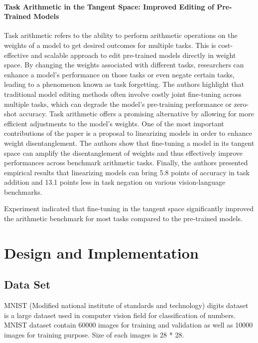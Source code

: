 \documentclass[conference]{IEEEtran}
\begin{document}
\paragraph{Task Arithmetic in the Tangent Space: Improved Editing of Pre-Trained Models} Task arithmetic refers to the ability to perform arithmetic operations on the weights of a model to get desired outcomes for multiple tasks. This is cost-effective and scalable approach to edit pre-trained models directly in weight space. By changing the weights associated with different tasks, researchers can enhance a model's performance on those tasks or even negate certain tasks, leading to a phenomenon known as task forgetting. The authors highlight that traditional model editing methods often involve costly joint fine-tuning across multiple tasks, which can degrade the model's pre-training performance or zero-shot accuracy. Task arithmetic offers a promising alternative by allowing for more efficient adjustments to the model's weights.
One of the most important contributions of the paper is a proposal to linearizing models in order to enhance weight disentanglement. The authors show that fine-tuning a model in its tangent space can amplify the disentanglement of weights and thus effectively improve performances across benchmark arithmetic tasks. Finally, the authors presented empirical results that linearizing models can bring 5.8 points of accuracy in task addition and 13.1 points less in task negation on various vision-language benchmarks.

Experiment indicated that fine-tuning in the tangent space significantly improved the arithmetic benchmark for most tasks compared to the pre-trained models. 



\section{Design and Implementation}

\subsection{Data Set}
MNIST (Modified national institute of standards and technology) digits dataset is a large dataset used in computer vision field for classification of numbers. MNIST dataset contain 60000 images for training and validation as well as 10000 images for training purpose. Size of each images is 28 * 28. 
\end{document}
